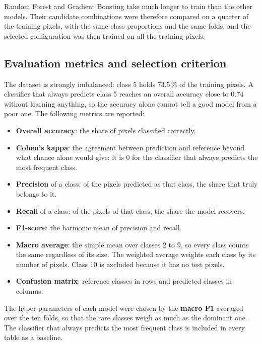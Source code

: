 \documentclass[11pt,a4paper]{article}
\begin{document}
Random Forest and Gradient Boosting take much longer to train than the other
models. Their candidate combinations were therefore compared on a quarter of
the training pixels, with the same class proportions and the same folds, and
the selected configuration was then trained on all the training pixels.

\begin{table}[H]
\centering\footnotesize
\caption{Candidate values of the hyper-parameters of each model.}
\label{tab:grid}

\end{table}

\subsection{Evaluation metrics and selection criterion}

The dataset is strongly imbalanced: class 5 holds 73.5\,\% of the training
pixels. A classifier that always predicts class 5 reaches an overall accuracy
close to 0.74 without learning anything, so the accuracy alone cannot tell a
good model from a poor one. The following metrics are reported:

\begin{itemize}
  \item \textbf{Overall accuracy}: the share of pixels classified correctly.
  \item \textbf{Cohen's kappa}: the agreement between prediction and
  reference beyond what chance alone would give; it is 0 for the classifier
  that always predicts the most frequent class.
  \item \textbf{Precision} of a class: of the pixels predicted as that class,
  the share that truly belongs to it.
  \item \textbf{Recall} of a class: of the pixels of that class, the share the
  model recovers.
  \item \textbf{F1-score}: the harmonic mean of precision and recall.
  \item \textbf{Macro average}: the simple mean over classes 2 to 9, so every
  class counts the same regardless of its size. The weighted average weights
  each class by its number of pixels. Class 10 is excluded because it has no
  test pixels.
  \item \textbf{Confusion matrix}: reference classes in rows and predicted
  classes in columns.
\end{itemize}

The hyper-parameters of each model were chosen by the \textbf{macro F1}
averaged over the ten folds, so that the rare classes weigh as much as the
dominant one. The classifier that always predicts the most frequent class is
included in every table as a baseline.
\end{document}
